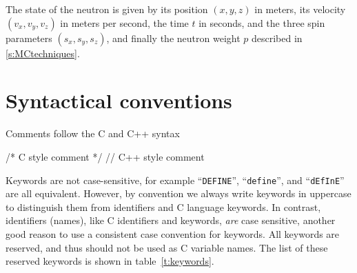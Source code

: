 The state of the neutron is given by
its position $(x,y,z)$ in meters, its velocity $(v_x, v_y, v_z)$ in
meters per second, the time $t$ in seconds, and the three spin parameters
$\left( s_x, s_y, s_z \right)$, and finally the neutron weight $p$ described in \ref{s:MCtechniques}.

\section{Syntactical conventions}
\label{s:syntax}

Comments follow the C and C++ syntax

\begin{mcstas}
/* C style comment  */  
// C++ style comment
\end{mcstas}



Keywords are not case-sensitive, for example ``\verb+DEFINE+'',
``\verb+define+'', and ``\verb+dEfInE+'' are all equivalent. However, by
convention we always write keywords in uppercase to distinguish them
from identifiers and C language keywords. In contrast, \MCS
identifiers (names), like C identifiers and keywords, \emph{are} case
sensitive, another good reason to use a consistent case convention for
keywords. All \MCS keywords are reserved, and thus should not be used
as C variable names. The list of these reserved keywords is shown in table~\ref{t:keywords}.

